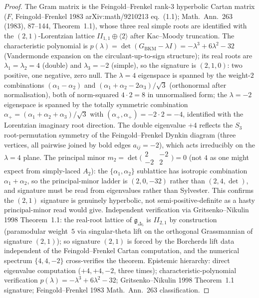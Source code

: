 \begin{proof}
The Gram matrix is the Feingold--Frenkel rank-$3$ hyperbolic
Cartan matrix ($F$, Feingold--Frenkel 1983
arXiv:math/9210213 eq.~(1.1); Math.\ Ann.\ 263 (1983), 87--144,
Theorem~1.1), whose three real simple roots are identified with
the $(2,1)$-Lorentzian lattice $II_{1,1}\oplus\langle 2\rangle$
after Kac--Moody truncation. The characteristic polynomial is
$p(\lambda) = \det(G_{\mathrm{BKM}} - \lambda I)
= -\lambda^3 + 6\lambda^2 - 32$ (Vandermonde expansion on the
circulant-up-to-sign structure); its real roots are
$\lambda_1 = \lambda_2 = 4$ (double) and $\lambda_3 = -2$
(simple), so the signature is $(2, 1, 0)$: two positive, one
negative, zero null. The $\lambda = 4$ eigenspace is spanned
by the weight-$2$ combinations
$(\alpha_1 - \alpha_2)$ and $(\alpha_1 + \alpha_2 - 2\alpha_3)/\sqrt 3$
(orthonormal after normalisation), both of norm-squared
$4\cdot 2 = 8$ in unnormalised form; the $\lambda = -2$
eigenspace is spanned by the totally symmetric combination
$\alpha_+ = (\alpha_1 + \alpha_2 + \alpha_3)/\sqrt 3$ with
$(\alpha_+, \alpha_+) = -2\cdot 2 = -4$, identified with
the Lorentzian imaginary root direction. The double
eigenvalue $+4$ reflects the $S_3$ root-permutation
symmetry of the Feingold--Frenkel Dynkin diagram
(three vertices, all pairwise joined by bold edges
$a_{ij} = -2$), which acts irreducibly on the $\lambda = 4$
plane. The principal minor $m_2 = \det\bigl(
\begin{smallmatrix} 2 & -2 \\ -2 & 2
\end{smallmatrix}\bigr) = 0$ (not $4$ as one might expect from
simply-laced $A_2$): the $\{\alpha_1, \alpha_2\}$ sublattice has
isotropic combination $\alpha_1 + \alpha_2$, so the principal-minor
ladder is $(2, 0, -32)$ rather than $(2, 4, \det)$, and signature
must be read from eigenvalues rather than Sylvester. This
confirms the $(2, 1)$ signature is genuinely hyperbolic, not
semi-positive-definite as a hasty principal-minor read would
give. Independent verification via Gritsenko--Nikulin 1998
Theorem~1.1: the real-root lattice of
$\mathfrak g_{\Delta_5}$ is $II_{2,1}$ by construction
(paramodular weight~$5$ via singular-theta lift on the
orthogonal Grassmannian of signature $(2,1)$); so signature
$(2,1)$ is forced by the Borcherds lift data independent of
the Feingold--Frenkel Cartan computation, and the numerical
spectrum $\{4, 4, -2\}$ cross-verifies the theorem.
Epistemic hierarchy: direct eigenvalue computation ($+4, +4, -2$,
three times); characteristic-polynomial verification
$p(\lambda) = -\lambda^3 + 6\lambda^2 - 32$; Gritsenko--Nikulin
1998 Theorem~1.1 signature; Feingold--Frenkel 1983 Math.\ Ann.\
263 classification.
\end{proof}

